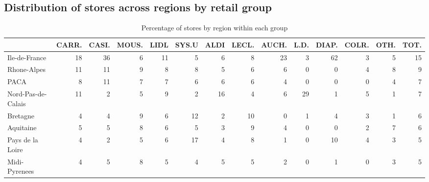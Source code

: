 \documentclass[11pt]{article}
\begin{document}
\subsection{Distribution of stores across regions by retail group}


\begin{table}[H]
\caption{Percentage of stores by region within each group}
\footnotesize
\setlength{\tabcolsep}{2pt}

\begin{tabular}{lrrrrrrrrrrrrr}
\toprule
\toprule
{} &      CARR. &      CASI. &      MOUS. &       LIDL &      SYS.U &       ALDI &      LECL. &      AUCH. &       L.D. &      DIAP. &      COLR. &       OTH. &       TOT. \\
\midrule
Ile-de-France        &         18 &         36 &          6 &         11 &          5 &          6 &          8 &         23 &          3 &         62 &          3 &          5 &         15 \\
Rhone-Alpes          &         11 &         11 &          9 &          8 &          8 &          5 &          6 &          6 &          0 &          0 &          4 &          8 &          9 \\
PACA                 &          8 &         11 &          7 &          7 &          6 &          6 &          6 &          4 &          0 &          0 &          0 &          4 &          7 \\
Nord-Pas-de-Calais   &         11 &          2 &          5 &          9 &          2 &         16 &          4 &          6 &         29 &          1 &          5 &          1 &          7 \\
Bretagne             &          4 &          4 &          9 &          6 &         12 &          2 &         10 &          0 &          1 &          4 &          3 &          1 &          6 \\
Aquitaine            &          5 &          5 &          8 &          6 &          5 &          3 &          9 &          4 &          0 &          0 &          2 &          7 &          6 \\
Pays de la Loire     &          4 &          2 &          5 &          6 &         17 &          4 &          8 &          1 &          0 &         10 &          4 &          3 &          5 \\
Midi-Pyrenees        &          4 &          5 &          8 &          5 &          4 &          5 &          5 &          2 &          0 &          1 &          0 &          3 &          5 \\

\end{tabular}
\end{table}
\end{document}
